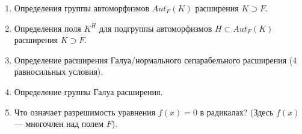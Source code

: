 \begin{enumerate}
\item Определения группы автоморфизмов $Aut_{F}(K)$ расширения $K \supset F$.

\item Определения поля $K^H$ для подгруппы автоморфизмов $H \subset Aut_F(K)$ расширения $K \supset F$.

\item Определение расширения Галуа/нормального сепарабельного расширения (4 равносильных условия).

\item Определение группы Галуа расширения.

\item Что означает разрешимость уравнения $f(x) = 0$ в радикалах? (Здесь $f(x)$ --- многочлен над полем $F$).

\end{enumerate}
